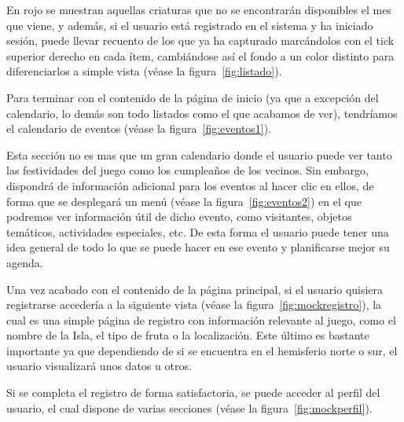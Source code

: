 En rojo se muestran aquellas criaturas que no se encontrarán disponibles el mes que viene, y además, si el usuario está registrado en el sistema y ha iniciado sesión, puede llevar recuento de los que ya ha capturado marcándolos con el tick superior derecho en cada ítem, cambiándose así el fondo a un color distinto para diferenciarlos a simple vista {(v\'ease la figura~\ref{fig:listado})}.\\


\clearpage

Para terminar con el contenido de la página de inicio (ya que a excepción del calendario, lo demás son todo listados como el que acabamos de ver), tendríamos el calendario de eventos {(v\'ease la figura~\ref{fig:eventos1})}.\\


Esta sección no es mas que un gran calendario donde el usuario puede ver tanto las festividades del juego como los cumpleaños de los vecinos. Sin embargo, dispondrá de información adicional para los eventos al hacer clic en ellos, de forma que se desplegará un menú {(v\'ease la figura~\ref{fig:eventos2})} en el que podremos ver información útil de dicho evento, como visitantes, objetos temáticos, actividades especiales, etc. De esta forma el usuario puede tener una idea general de todo lo que se puede hacer en ese evento y planificarse mejor su agenda.\\


\clearpage

Una vez acabado con el contenido de la página principal, si el usuario quisiera registrarse accedería a la siguiente vista {(v\'ease la figura~\ref{fig:mockregistro})}, la cual es una simple página de registro con información relevante al juego, como el nombre de la Isla, el tipo de fruta o la localización. Este último es bastante importante ya que dependiendo de si se encuentra en el hemisferio norte o sur, el usuario visualizará unos datos u otros.\\


Si se completa el registro de forma satisfactoria, se puede acceder al perfil del usuario, el cual dispone de varias secciones {(v\'ease la figura~\ref{fig:mockperfil})}.\\

